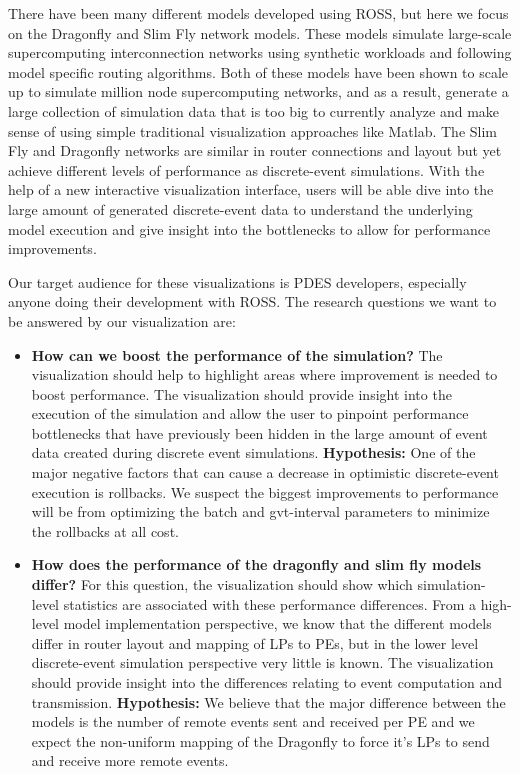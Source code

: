 \documentclass{acm_proc_article-sp}
\begin{document}
There have been many different models developed using ROSS, but here we focus on the Dragonfly \cite{Dragonfly} and Slim Fly \cite{slimfly} network models. These models simulate large-scale supercomputing interconnection networks using synthetic workloads and following model specific routing algorithms. Both of these models have been shown to scale up to simulate million node supercomputing networks, and as a result, generate a large collection of simulation data that is too big to currently analyze and make sense of using simple traditional visualization approaches like Matlab. The Slim Fly and Dragonfly networks are similar in router connections and layout but yet achieve different levels of performance as discrete-event simulations. With the help of a new interactive visualization interface, users will be able dive into the large amount of generated discrete-event data to understand the underlying model execution and give insight into the bottlenecks to allow for performance improvements.

Our target audience for these visualizations is PDES developers, especially anyone doing their development with ROSS.  The research questions we want to be answered by our visualization are:
\begin{itemize}
\item \textbf{How can we boost the performance of the simulation?} The visualization should help to highlight areas where improvement is needed to boost performance. The visualization should provide insight into the execution of the simulation and allow the user to pinpoint performance bottlenecks that have previously been hidden in the large amount of event data created during discrete event simulations. \textbf{Hypothesis:} One of the major negative factors that can cause a decrease in optimistic discrete-event execution is rollbacks. We suspect the biggest improvements to performance will be from optimizing the batch and gvt-interval parameters to minimize the rollbacks at all cost.
\item  \textbf{How does the performance of the dragonfly and slim fly models differ?}  For this question, the visualization should show which simulation-level statistics are associated with these performance differences. From a high-level model implementation perspective, we know that the different models differ in router layout and mapping of LPs to PEs, but in the lower level discrete-event simulation perspective very little is known. The visualization should provide insight into the differences relating to event computation and transmission. \textbf{Hypothesis:} We believe that the major difference between the models is the number of remote events sent and received per PE and we expect the non-uniform mapping of the Dragonfly to force it's LPs to send and receive more remote events.
\end{itemize}
\end{document}
